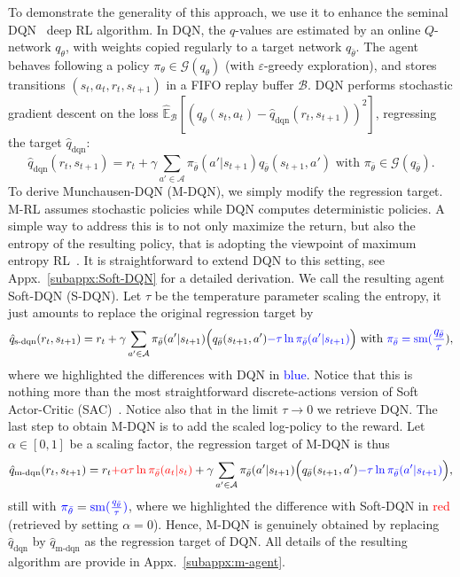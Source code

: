 \documentclass{article}
\newcommand{\gr}{\mathcal{G}}
\DeclareMathOperator*{\softmax}{sm}
\newcommand{\actions}{\mathcal{A}}
\begin{document}
To demonstrate the generality of this approach, we use it to enhance the seminal DQN~\cite{mnih2015human} deep RL algorithm. In DQN, the $q$-values are estimated by an online $Q$-network $q_\theta$, with weights copied regularly to a target network $q_{\bar\theta}$. The agent behaves following a policy $\pi_\theta \in \gr(q_\theta)$ (with $\varepsilon$-greedy exploration), and stores transitions $(s_t,a_t,r_t, s_{t+1})$ in a FIFO replay buffer $\mathcal{B}$. DQN performs stochastic gradient descent on the loss $\hat{\mathbb{E}}_\mathcal{B}[(q_\theta(s_t,a_t) - \hat{q}_\text{dqn}(r_t, s_{t+1}))^2]$, regressing the target $\hat{q}_\text{dqn}$:
\begin{equation}
\label{eq:dqn_target}
    \hat{q}_\text{dqn}(r_t, s_{t+1}) = r_t + \gamma \sum_{a'\in\actions} \pi_{\bar{\theta}}(a'|s_{t+1}) q_{\bar\theta}(s_{t+1}, a') \text{ with } \pi_{\bar{\theta}}\in\gr(q_{\bar{\theta}}).
\end{equation}
To derive Munchausen-DQN (M-DQN), we simply modify the regression target. M-RL assumes stochastic policies while DQN computes  deterministic policies. A simple way to address this is to not only maximize the return, but also the entropy of the resulting policy, that is adopting the viewpoint of maximum entropy RL~\cite{ziebart2010modeling,haarnoja2018soft}. It is straightforward to extend DQN to this setting, see Appx.~\ref{subappx:Soft-DQN} for a detailed derivation. We call the resulting agent Soft-DQN (S-DQN). Let $\tau$ be the temperature parameter scaling the entropy, it just amounts to replace the original regression target by
\begin{equation}
\label{eq:soft_dqn_target}
    \hat{q}_\text{s-dqn}(r_t, s_{t+1}) = r_t + \gamma \sum_{a' \in \actions} \pi_{\bar{\theta}}(a'|s_{t+1}) \Big(q_{\bar\theta}(s_{t+1}, a') \textcolor{blue}{- \tau \ln \pi_{\bar\theta}(a'|s_{t+1})}\Big) \text{ with } \textcolor{blue}{\pi_{\bar{\theta}}=\softmax(\frac{q_{\bar\theta}}{\tau}}),
\end{equation}
where we highlighted the differences with DQN in \textcolor{blue}{blue}. Notice that this is nothing more than the most straightforward discrete-actions version of Soft Actor-Critic (SAC)~\cite{haarnoja2018soft}. Notice also that in the limit $\tau\rightarrow 0$ we retrieve DQN. The last step to obtain M-DQN is to add the scaled log-policy to the reward.
Let $\alpha\in[0,1]$ be a scaling factor, the regression target of M-DQN is thus
\begin{equation}
    \hat{q}_\text{m-dqn}(r_t, s_{t+1}) = r_t \textcolor{red}{+\alpha\tau\ln\pi_{\bar{\theta}}(a_t|s_t)} + \gamma \sum_{a' \in \actions} \pi_{\bar{\theta}}(a'|s_{t+1}) \Big(q_{\bar\theta}(s_{t+1}, a') \textcolor{blue}{- \tau \ln \pi_{\bar\theta}(a'|s_{t+1})}\Big) ,
    \label{eq:munchausen_dqn_target}
\end{equation}
still with $\textcolor{blue}{\pi_{\bar{\theta}}}=\textcolor{blue}{\softmax(\frac{q_{\bar\theta}}{\tau})}$,
where we highlighted the difference with Soft-DQN in \textcolor{red}{red} (retrieved by setting $\alpha=0$). Hence, M-DQN is genuinely obtained by replacing $\hat{q}_\text{dqn}$ by 
$\hat{q}_\text{m-dqn}$ as the regression target of DQN. All details of the resulting algorithm are provide in Appx.~\ref{subappx:m-agent}.
\end{document}
